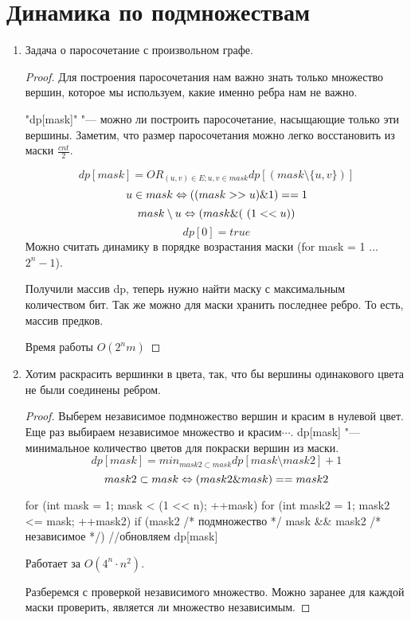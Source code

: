 \section{Динамика по подмножествам}
\begin{enumerate}
\item 
Задача о паросочетание с произвольном графе. 

\begin{proof}
    Для построения паросочетания нам важно знать только множество вершин, которое мы используем, какие именно ребра нам не важно. 

    \cpp"dp[mask]" "--- можно ли построить паросочетание, насыщающие только эти вершины. Заметим, что размер паросочетания можно 
    легко восстановить из маски $\frac{cnt}{2}$.

    $$dp[mask] = OR_{(u, v) \in E; u, v \in mask} dp[(mask \setminus \{u, v\})]$$
    $$u \in mask \Leftrightarrow ((mask >> u)\&1) == 1$$
    $$mask \setminus u \Leftrightarrow (mask \& (~(1 << u))$$
    $$dp[0] = true$$
    Можно считать динамику в порядке возрастания маски (for mask = 1 ... $2^n - 1$).

    Получили массив dp, теперь нужно найти маску с максимальным количеством бит. Так же можно для маски хранить последнее ребро. То есть, 
    массив предков. 

    Время работы $O(2^n m)$
\end{proof}
\item Хотим раскрасить вершинки в цвета, так, что бы вершины одинакового цвета не 
были соединены ребром. 
\begin{proof}
    Выберем независимое подмножество вершин и красим в нулевой цвет. Еще раз выбираем независимое множество и красим$\cdots$.
    dp[mask] "--- минимальное количество цветов для покраски вершин из маски.
    $$dp[mask] = min_{mask2 \subset mask} dp[mask \setminus mask2] + 1$$
    $$mask2 \subset mask \Leftrightarrow (mask2 \& mask)== mask2$$

    \begin{cppcode}
    for (int mask = 1; mask < (1 << n); ++mask) {
        for (int mask2 = 1; mask2 <= mask; ++mask2) {
            if (mask2 /* подмножество */ mask && mask2 /* независимое */) {
                //обновляем dp[mask]    
            }
        }
    }
    \end{cppcode}

    Работает за $O(4^n \cdot n^2)$.

    Разберемся с проверкой независимого множество. Можно заранее для каждой маски проверить, является ли множество независимым. 


\end{proof}
\end{enumerate}
